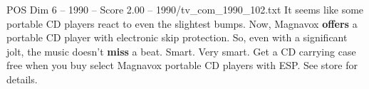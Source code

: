 \begin{textsample}{POS Dim 6 – 1990 – Score 2.00 – 1990/tv\_com\_1990\_102.txt}  \label{ex:f6_pos_072}
It seems like some portable CD players react to even the slightest bumps.
Now, Magnavox \textbf{offers} a portable CD player with electronic skip protection.
So, even with a significant jolt, the music doesn't \textbf{miss} a beat.
Smart.
Very smart.
Get a CD carrying case free when you buy select Magnavox portable CD players with ESP.
See store for details.

\end{textsample}
